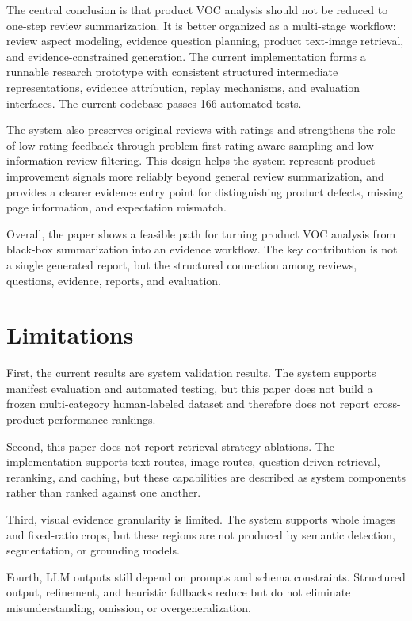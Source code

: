 \documentclass[11pt]{article}
\begin{document}
The central conclusion is that product VOC analysis should not be reduced to one-step review summarization. It is better organized as a multi-stage workflow: review aspect modeling, evidence question planning, product text-image retrieval, and evidence-constrained generation. The current implementation forms a runnable research prototype with consistent structured intermediate representations, evidence attribution, replay mechanisms, and evaluation interfaces. The current codebase passes 166 automated tests.

The system also preserves original reviews with ratings and strengthens the role of low-rating feedback through problem-first rating-aware sampling and low-information review filtering. This design helps the system represent product-improvement signals more reliably beyond general review summarization, and provides a clearer evidence entry point for distinguishing product defects, missing page information, and expectation mismatch.

Overall, the paper shows a feasible path for turning product VOC analysis from black-box summarization into an evidence workflow. The key contribution is not a single generated report, but the structured connection among reviews, questions, evidence, reports, and evaluation.

\section{Limitations}
First, the current results are system validation results. The system supports manifest evaluation and automated testing, but this paper does not build a frozen multi-category human-labeled dataset and therefore does not report cross-product performance rankings.

Second, this paper does not report retrieval-strategy ablations. The implementation supports text routes, image routes, question-driven retrieval, reranking, and caching, but these capabilities are described as system components rather than ranked against one another.

Third, visual evidence granularity is limited. The system supports whole images and fixed-ratio crops, but these regions are not produced by semantic detection, segmentation, or grounding models.

Fourth, LLM outputs still depend on prompts and schema constraints. Structured output, refinement, and heuristic fallbacks reduce but do not eliminate misunderstanding, omission, or overgeneralization.
\end{document}
